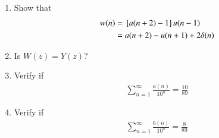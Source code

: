 \documentclass[journal,12pt,twocolumn]{IEEEtran}
\renewcommand\thesection{\arabic{section}}
\begin{document}
\begin{enumerate}[label=\thesection.\arabic*
,ref=\thesection.\theenumi]
\begin{align}
&= \frac{z^{-1}}{\brak{1- z^{-1}-z^{-2}}\brak{1- z^{-1}}}
\end{align}
\item Show that 
\begin{align}
w(n)&={}\left[a(n+2)-1\right]u(n-1)
\\
&=a(n+2)-u(n+1)+2\delta(n)
\end{align}
\item Is $W(z)=Y(z)$?
\item Verify if 
\begin{align}
\sum_{n=1}^{\infty}\frac{a(n)}{10^n} = \frac{10}{89}
\end{align}
\item Verify if 
\begin{align}
\sum_{n=1}^{\infty}\frac{b(n)}{10^n} = \frac{8}{89}
\end{align}

\end{enumerate}
\end{document}
